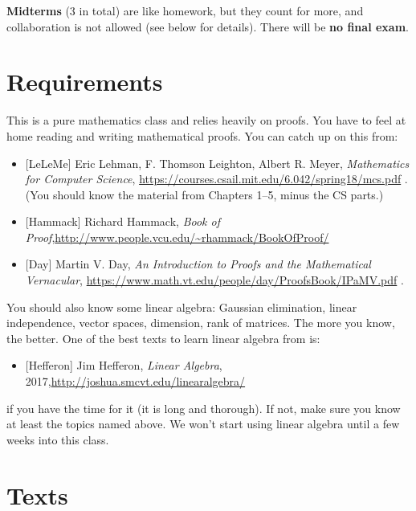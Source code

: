 \documentclass[numbers=enddot,12pt,final,onecolumn,notitlepage]{scrartcl}%
\theoremstyle{definition}
\begin{document}
\bigskip

\textbf{Midterms} (3 in total) are like homework, but they count for more, and
collaboration is not allowed (see below for details). There will be \textbf{no
final exam}.

\section{Requirements}

This is a pure mathematics class and relies heavily on proofs. You have to
feel at home reading and writing mathematical proofs. You can catch up on this from:

\begin{itemize}
\item {}[LeLeMe] Eric Lehman, F. Thomson Leighton, Albert R. Meyer,
\textit{Mathematics for Computer Science}, \newline%
\url{https://courses.csail.mit.edu/6.042/spring18/mcs.pdf} . (You should know
the material from Chapters 1--5, minus the CS parts.)

\item {}[Hammack] Richard Hammack, \textit{Book of Proof},\newline\url{http://www.people.vcu.edu/~rhammack/BookOfProof/}

\item {}[Day] Martin V. Day, \textit{An Introduction to Proofs and the
Mathematical Vernacular},\newline%
\url{https://www.math.vt.edu/people/day/ProofsBook/IPaMV.pdf} .
\end{itemize}

You should also know some linear algebra: Gaussian elimination, linear
independence, vector spaces, dimension, rank of matrices. The more you know,
the better. One of the best texts to learn linear algebra from is:

\begin{itemize}
\item {}[Hefferon] Jim Hefferon, \textit{Linear Algebra}, 2017,\newline\url{http://joshua.smcvt.edu/linearalgebra/}
\end{itemize}

\noindent if you have the time for it (it is long and thorough). If not, make
sure you know at least the topics named above. We won't start using linear
algebra until a few weeks into this class.

\section{Texts}
\end{document}
